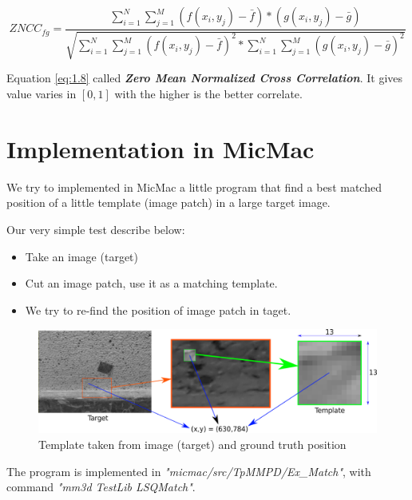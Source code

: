 \documentclass[twoside]{article}
\begin{document}
\begin{equation}
ZNCC_{fg} = \frac{\sum_{i=1}^{N}\sum_{j=1}^{M}(f(x_i,y_j)-\bar{f})*(g(x_i,y_j)-\bar{g})}
{\sqrt{\sum_{i=1}^{N}\sum_{j=1}^{M}(f(x_i,y_j)-\bar{f})^2*\sum_{i=1}^{N}\sum_{j=1}^{M}(g(x_i,y_j)-\bar{g})^2}}
\label{eq:1.8}
\end{equation}

Equation \ref{eq:1.8} called \textit{\textbf{Zero Mean Normalized Cross Correlation}}. It gives value varies in $[0,1]$ with the higher is the better correlate.

\section{Implementation in MicMac} 
We try to implemented in MicMac a little program that find a best matched position of a little template (image patch) in a large target image. 

Our very simple test describe below:
\begin{itemize}
  \item Take an image (target)
  \item Cut an image patch, use it as a matching template.
  \item We try to re-find the position of image patch in taget.
\end{itemize}

\begin{figure}[h] 
\includegraphics[width=15cm]{template_target.png}
\caption{Template taken from image (target) and ground truth position}
\label{fig:1.2}
\end{figure}

The program is implemented in \textit{"micmac/src/TpMMPD/Ex\_Match"}, 
with command \textit{"mm3d TestLib LSQMatch"}. 
\end{document}
